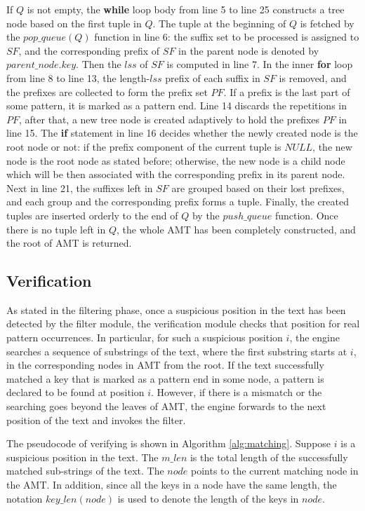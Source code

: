 \documentclass{article}
\begin{document}
If $Q$ is not empty, the \textbf{while} loop body from line 5 to line
25 constructs a tree node based on the first tuple in $Q$. The tuple
at the beginning of $Q$ is fetched by the $pop\_queue(Q)$ function in
line 6: the suffix set to be processed is assigned to $SF$, and the
corresponding prefix of $SF$ in the parent node is denoted by
$parent\_node.key$. Then the $lss$ of $SF$ is computed in line 7. In
the inner \textbf{for} loop from line 8 to line 13, the length-$lss$
prefix of each suffix in $SF$ is removed, and the prefixes are
collected to form the prefix set $PF$. If a prefix is the last part of
some pattern, it is marked as a pattern end. Line 14 discards the
repetitions in $PF$, after that, a new tree node is created adaptively
to hold the prefixes $PF$ in line 15. The \textbf{if} statement in
line 16 decides whether the newly created node is the root node or
not: if the prefix component of the current tuple is $NULL$, the new
node is the root node as stated before; otherwise, the new node is a
child node which will be then associated with the corresponding prefix
in its parent node. Next in line 21, the suffixes left in $SF$ are
grouped based on their lost prefixes, and each group and the
corresponding prefix forms a tuple. Finally, the created tuples are
inserted orderly to the end of $Q$ by the $push\_queue$ function. Once
there is no tuple left in $Q$, the whole AMT has been completely
constructed, and the root of AMT is returned.

\subsection{Verification}
\label{subsec:matching}

As stated in the filtering phase, once a suspicious position in the
text has been detected by the filter module, the verification module
checks that position for real pattern occurrences. In particular, for
such a suspicious position $i$, the engine searches a sequence of
substrings of the text, where the first substring starts at $i$, in
the corresponding nodes in AMT from the root. If the text successfully
matched a key that is marked as a pattern end in some node, a pattern
is declared to be found at position $i$. However, if there is a
mismatch or the searching goes beyond the leaves of AMT, the engine
forwards to the next position of the text and invokes the filter.

The pseudocode of verifying is shown in Algorithm
\ref{alg:matching}. Suppose $i$ is a suspicious position in the
text. The $m\_len$ is the total length of the successfully matched
sub-strings of the text. The $node$ points to the current matching
node in the AMT. In addition, since all the keys in a node have the
same length, the notation $key\_len(node)$ is used to denote the
length of the keys in $node$.
\end{document}
